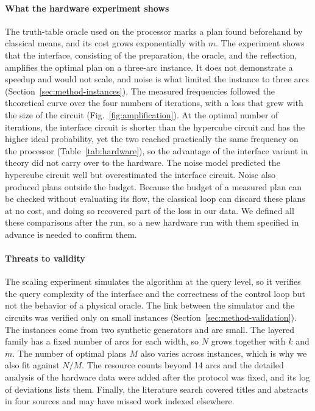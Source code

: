\paragraph{What the hardware experiment shows} The truth-table oracle used on the processor marks a plan found beforehand by classical means, and its cost grows exponentially with $m$. The experiment shows that the interface, consisting of the preparation, the oracle, and the reflection, amplifies the optimal plan on a three-arc instance. It does not demonstrate a speedup and would not scale, and noise is what limited the instance to three arcs (Section~\ref{sec:method-instances}). The measured frequencies followed the theoretical curve over the four numbers of iterations, with a loss that grew with the size of the circuit (Fig.~\ref{fig:amplification}). At the optimal number of iterations, the interface circuit is shorter than the hypercube circuit and has the higher ideal probability, yet the two reached practically the same frequency on the processor (Table~\ref{tab:hardware}), so the advantage of the interface variant in theory did not carry over to the hardware. The noise model predicted the hypercube circuit well but overestimated the interface circuit. Noise also produced plans outside the budget. Because the budget of a measured plan can be checked without evaluating its flow, the classical loop can discard these plans at no cost, and doing so recovered part of the loss in our data. We defined all these comparisons after the run, so a new hardware run with them specified in advance is needed to confirm them.

\paragraph{Threats to validity} The scaling experiment simulates the algorithm at the query level, so it verifies the query complexity of the interface and the correctness of the control loop but not the behavior of a physical oracle. The link between the simulator and the circuits was verified only on small instances (Section~\ref{sec:method-validation}). The instances come from two synthetic generators and are small. The layered family has a fixed number of arcs for each width, so $N$ grows together with $k$ and $m$. The number of optimal plans $M$ also varies across instances, which is why we also fit against $N/M$. The resource counts beyond 14 arcs and the detailed analysis of the hardware data were added after the protocol was fixed, and its log of deviations lists them. Finally, the literature search covered titles and abstracts in four sources and may have missed work indexed elsewhere.

